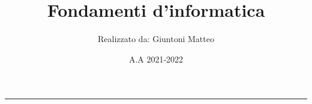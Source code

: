 \documentclass[a4paper,10pt]{article}
\title{\textbf{Fondamenti d'informatica}}
\author{Realizzato da: Giuntoni Matteo}
\date{A.A 2021-2022}
\theoremstyle{definition}
\theoremstyle{definition}
\theoremstyle{plain}
\theoremstyle{plain}
\theoremstyle{plain}
\theoremstyle{plain}
\begin{document}


\tableofcontents
\newpage
\maketitle
\begin{center}
    \vspace{-20pt}
    \rule{11cm}{.1pt} 
\end{center}







\end{document}
